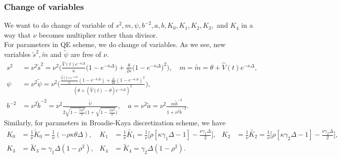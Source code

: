 \documentclass{ws-ijfe}
\begin{document}
\subsubsection{Change of variables}
We want to do change of variable of $s^2, m, \psi, b^{-2}, a, b, K_0,K_1,K_2, K_3,$ and $ K_4$ in a way that $\nu$ becomes multiplier rather than divisor.\\
For parameters in QE scheme, we do change of variables. As we see, new variables $\tilde{s}^2, \tilde{m}$ and $\tilde{\psi}$ are free of $\nu$.
\begin{align*}
s^2&=\nu^2\tilde{s}^2={\nu}^2\bigg(\frac{\hat{V}(t)e^{-\kappa\Delta}}{\kappa}\bigg(1-e^{-\kappa\Delta}\bigg)+\frac{\theta}{2\kappa}\bigg(1-e^{-\kappa\Delta}\bigg)^2\bigg),
\quad m=\tilde{m}=\theta + \hat{V}(t)e^{-\kappa\Delta}, \\
  \psi&=\nu^2\tilde{\psi}=\nu^2\bigg(\frac{\frac{\hat{V}(t)e^{-\kappa\Delta}}{\kappa}(1-e^{-\kappa\Delta})+\frac{\theta}{2\kappa}(1-e^{-\kappa\Delta})^2}{(\theta+(\hat{V}(t)-\theta)e^{-\kappa\Delta})^2}\bigg),\\
b^{-2}&=\nu^2\tilde{b}^{-2}=\nu^2\frac{\tilde{\psi}}{2\sqrt{1-\frac{\tilde{\psi}\nu^2}{2}}\bigg(1+\sqrt{1-\frac{\tilde{\psi}\nu^2}{2}}\bigg)} ,\quad
a=\nu^2\tilde{a}=\nu^2\frac{m\tilde{b}^{-2}}{1+\nu^2\tilde{b}^{-2}}.
\end{align*}
Similarly, for parameters in Broadie-Kaya discretization scheme, we have
\begin{align*}
   K_0&=\frac{1}{\nu}\tilde{K}_0 =\frac{1}{\nu}(-\rho\kappa\theta\Delta),&   K_1&=\frac{1}{\nu}\tilde{K_1}=\frac{1}{\nu}\bigg[\rho[\kappa\gamma_1\Delta-1]-\frac{\nu\gamma_1\Delta}{2}\bigg],
&  K_2&=\frac{1}{\nu}\tilde{K_2}=\frac{1}{\nu}\bigg[\rho[\kappa\gamma_2\Delta-1]-\frac{\nu\gamma_2\Delta}{2}\bigg],\\
   K_3&=\tilde{K}_3=\gamma_1\Delta(1-\rho^2), & K_4&=\tilde{K}_4=\gamma_2\Delta(1-\rho^2).
\end{align*}
\end{document}
